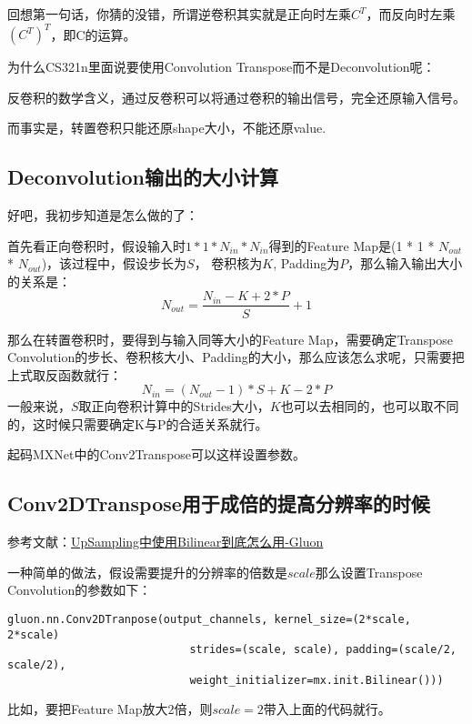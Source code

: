 回想第一句话，你猜的没错，所谓逆卷积其实就是正向时左乘$C^T$，而反向时左乘$(C^T)^T$，即C的运算。

为什么CS321n里面说要使用Convolution Transpose而不是Deconvolution呢：

反卷积的数学含义，通过反卷积可以将通过卷积的输出信号，完全还原输入信号。

而事实是，转置卷积只能还原shape大小，不能还原value.

\subsection{Deconvolution输出的大小计算}

好吧，我初步知道是怎么做的了：

首先看正向卷积时，假设输入时$1 * 1 * N_{in} * N_{in}$得到的Feature Map是(1 * 1 * $N_{out}$ * $N_{out}$)，该过程中，假设步长为$S$， 卷积核为$K$, Padding为$P$，那么输入输出大小的关系是：
\begin{displaymath}
N_{out} = \frac{N_{in} - K + 2 * P}{S} + 1
\end{displaymath}

那么在转置卷积时，要得到与输入同等大小的Feature Map，需要确定Transpose Convolution的步长、卷积核大小、Padding的大小，那么应该怎么求呢，只需要把上式取反函数就行：
\begin{displaymath}
N_{in} = (N_{out} - 1) * S + K - 2 * P
\end{displaymath}
一般来说，$S$取正向卷积计算中的Strides大小，$K$也可以去相同的，也可以取不同的，这时候只需要确定K与P的合适关系就行。

起码MXNet中的Conv2Transpose可以这样设置参数。

\subsection{Conv2DTranspose用于成倍的提高分辨率的时候}

参考文献：\href{https://discuss.gluon.ai/t/topic/2823/4}{UpSampling中使用Bilinear到底怎么用-Gluon}

一种简单的做法，假设需要提升的分辨率的倍数是$scale$那么设置Transpose Convolution的参数如下：
\begin{verbatim}
gluon.nn.Conv2DTranpose(output_channels, kernel_size=(2*scale, 2*scale) 
							strides=(scale, scale), padding=(scale/2, scale/2), 
							weight_initializer=mx.init.Bilinear()))
\end{verbatim}

比如，要把Feature Map放大2倍，则$scale=2$带入上面的代码就行。


